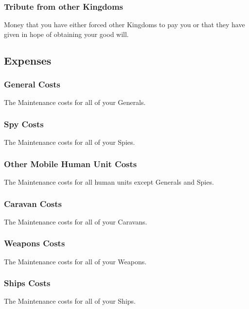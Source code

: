 \subsubsection{Tribute from other Kingdoms}

Money that you have either forced other Kingdoms to pay you or that they have given in hope of obtaining your good will.

\subsection{Expenses}


\subsubsection{General Costs}

The Maintenance costs for all of your Generals.

\subsubsection{Spy Costs}

The Maintenance costs for all of your Spies.

\subsubsection{Other Mobile Human Unit Costs}

The Maintenance costs for all human units except Generals and Spies.

\subsubsection{Caravan Costs}

The Maintenance costs for all of your Caravans.

\subsubsection{Weapons Costs}

The Maintenance costs for all of your Weapons.

\subsubsection{Ships Costs}

The Maintenance costs for all of your Ships.

